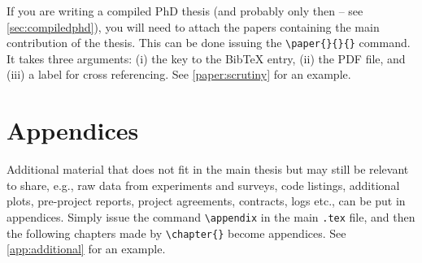 If you are writing a compiled PhD thesis (and probably only then – see \cref{sec:compiledphd}), you will need to attach the papers containing the main contribution of the thesis. This can be done issuing the \texttt{\textbackslash paper\{\}\{\}\{\}} command. It takes three arguments: (i) the key to the Bib\TeX{} entry, (ii) the PDF file, and (iii) a label for cross referencing. See \cref{paper:scrutiny} for an example.

\section{Appendices}

Additional material that does not fit in the main thesis but may still be relevant to share, e.g., raw data from experiments and surveys, code listings, additional plots, pre-project reports, project agreements, contracts, logs etc., can be put in appendices. Simply issue the command \texttt{\textbackslash appendix} in the main \texttt{.tex} file, and then the following chapters made by \texttt{\textbackslash chapter\{\}} become appendices. See \cref{app:additional} for an example.